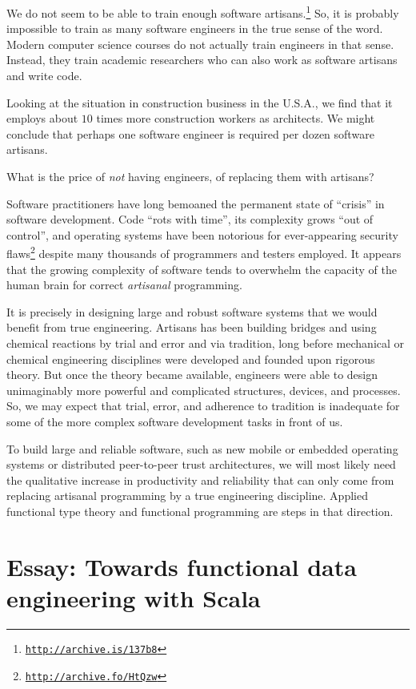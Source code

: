 We do not seem to be able to train enough software artisans.\footnote{\texttt{\href{http://archive.is/137b8}{http://archive.is/137b8}}}
So, it is probably impossible to train as many software engineers
in the true sense of the word. Modern computer science courses do
not actually train engineers in that sense. Instead, they train academic
researchers who can also work as software artisans and write code.

Looking at the situation in construction business in the U.S.A., we
find that it employs about $10$ times more construction workers as
architects. We might conclude that perhaps one software engineer is
required per dozen software artisans.

What is the price of \emph{not} having engineers, of replacing them
with artisans?

Software practitioners have long bemoaned the permanent state of \textsf{``}crisis\textsf{''}
in software development. Code \textsf{``}rots with time\textsf{''}, its complexity
grows \textsf{``}out of control\textsf{''}, and operating systems have been notorious
for ever-appearing security flaws\footnote{\texttt{\href{http://archive.fo/HtQzw}{http://archive.fo/HtQzw}}}
despite many thousands of programmers and testers employed. It appears
that the growing complexity of software tends to overwhelm the capacity
of the human brain for correct \emph{artisanal} programming.

It is precisely in designing large and robust software systems that
we would benefit from true engineering. Artisans has been building
bridges and using chemical reactions by trial and error and via tradition,
long before mechanical or chemical engineering disciplines were developed
and founded upon rigorous theory. But once the theory became available,
engineers were able to design unimaginably more powerful and complicated
structures, devices, and processes. So, we may expect that trial,
error, and adherence to tradition is inadequate for some of the more
complex software development tasks in front of us. 

To build large and reliable software, such as new mobile or embedded
operating systems or distributed peer-to-peer trust architectures,
we will most likely need the qualitative increase in productivity
and reliability that can only come from replacing artisanal programming
by a true engineering discipline. Applied functional type theory and
functional programming are steps in that direction.

\chapter{Essay: Towards functional data engineering with Scala}

